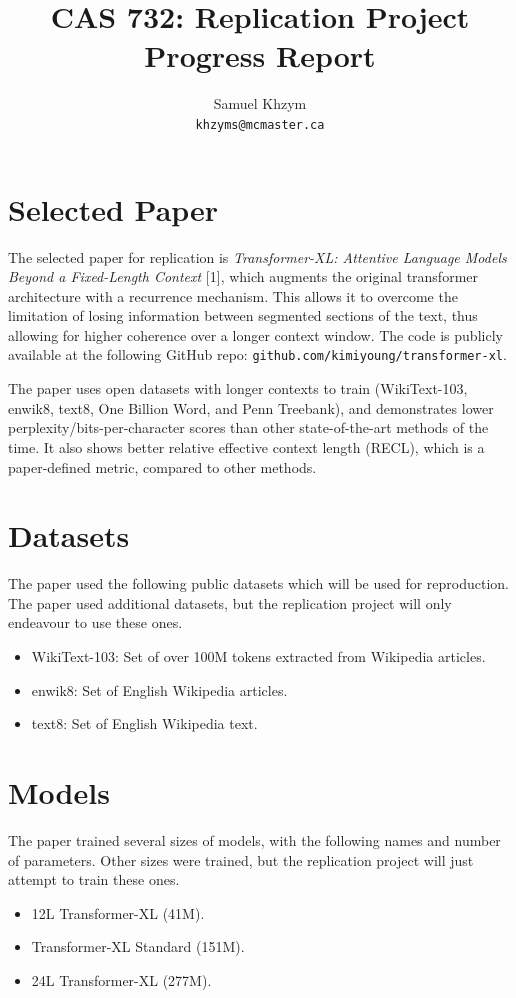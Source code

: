 \documentclass[11pt]{article}
\title{CAS 732: Replication Project Progress Report}
\author{Samuel Khzym \\
  \texttt{khzyms@mcmaster.ca}}
\begin{document}
\nolinenumbers

\maketitle

\section{Selected Paper}

The selected paper for replication is \textit{Transformer-XL: Attentive Language Models Beyond a Fixed-Length Context} [1], which augments the original transformer architecture with a recurrence mechanism. This allows it to overcome the limitation of losing information between segmented sections of the text, thus allowing for higher coherence over a longer context window. The code is publicly available at the following GitHub repo: \verb|github.com/kimiyoung/transformer-xl|.

The paper uses open datasets with longer contexts to train (WikiText-103, enwik8, text8, One Billion Word, and Penn Treebank), and demonstrates lower perplexity/bits-per-character scores than other state-of-the-art methods of the time. It also shows better relative effective context length (RECL), which is a paper-defined metric, compared to other methods.

\section{Datasets}

The paper used the following public datasets which will be used for reproduction. The paper used additional datasets, but the replication project will only endeavour to use these ones.

\begin{itemize}
\item WikiText-103: Set of over 100M tokens extracted from Wikipedia articles.
\item enwik8: Set of English Wikipedia articles.
\item text8: Set of English Wikipedia text.
\end{itemize}

\section{Models}

The paper trained several sizes of models, with the following names and number of parameters. Other sizes were trained, but the replication project will just attempt to train these ones.
\begin{itemize}
\item 12L Transformer-XL (41M). 
\item Transformer-XL Standard (151M).
\item 24L Transformer-XL (277M).
\end{itemize}
\end{document}

